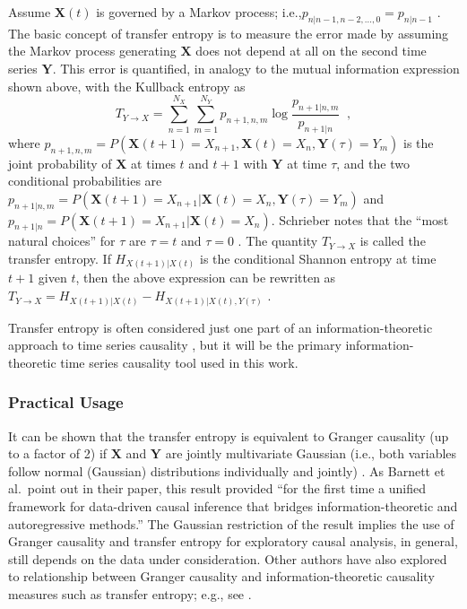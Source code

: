 \documentclass{article}[10pt]
\begin{document}
Assume $\mathbf{X}(t)$ is governed by a Markov process; i.e.,$p_{n|n-1,n-2,\ldots,0} = p_{n|n-1}$ \cite{statstextbook_placeholder}.  The basic concept of transfer entropy is to measure the error made by assuming the Markov process generating $\mathbf{X}$ does not depend at all on the second time series $\mathbf{Y}$.  This error is quantified, in analogy to the mutual information expression shown above, with the Kullback entropy as
\begin{equation}
T_{Y\rightarrow X} = \sum_{n=1}^{N_X} \sum_{m=1}^{N_Y} p_{n+1,n,m}\log \frac{p_{n+1|n,m}}{p_{n+1|n}}\;\;,
\end{equation}
where $p_{n+1,n,m} = P(\mathbf{X}(t+1)=X_{n+1},\mathbf{X}(t)=X_n,\mathbf{Y}(\tau)=Y_m)$ is the joint probability of $\mathbf{X}$ at times $t$ and $t+1$ with $\mathbf{Y}$ at time $\tau$, and the two conditional probabilities are $p_{n+1|n,m} = P(\mathbf{X}(t+1)=X_{n+1}|\mathbf{X}(t)=X_n,\mathbf{Y}(\tau)=Y_m)$ and $p_{n+1|n} = P(\mathbf{X}(t+1)=X_{n+1}|\mathbf{X}(t)=X_n)$.  Schrieber notes that the ``most natural choices'' for $\tau$ are $\tau=t$ and $\tau=0$ \cite{Schreiber2000}.  The quantity $T_{Y\rightarrow X}$ is called the transfer entropy.  If $H_{X(t+1)|X(t)}$ is the conditional Shannon entropy at time $t+1$ given $t$, then the above expression can be rewritten as $T_{Y\rightarrow X} = H_{X(t+1)|X(t)}-H_{X(t+1)|X(t),Y(\tau)}$ \cite{Kaiser2002}. 

Transfer entropy is often considered just one part of an information-theoretic approach to time series causality \cite{Hlavackova2007}, but it will be the primary information-theoretic time series causality tool used in this work.

\subsubsection{Practical Usage}
It can be shown that the transfer entropy is equivalent to Granger causality (up to a factor of 2) if $\mathbf{X}$ and $\mathbf{Y}$ are jointly multivariate Gaussian (i.e., both variables follow normal (Gaussian) distributions individually and jointly) \cite{Barnett2009}.  As Barnett et al.\ point out in their paper, this result provided ``for the first time a unified framework for data-driven causal inference that bridges information-theoretic and autoregressive methods.''  The Gaussian restriction of the result implies the use of Granger causality and transfer entropy for exploratory causal analysis, in general, still depends on the data under consideration.  Other authors have also explored to relationship between Granger causality and information-theoretic causality measures such as transfer entropy; e.g., see \cite{Amblard2012,Lungarella2007}.
\end{document}
